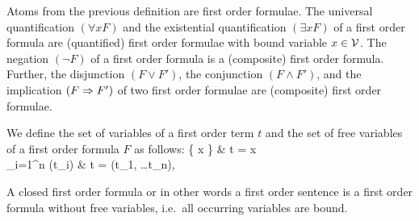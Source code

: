 
\begin{definition}\label{def:syntax:FOF}
	Atoms from the previous definition are {\myem first order formulae}.  
	The universal quantification $(\forall x F)$ 
	and the existential quantification $(\exists x F)$ 
	of a first order formula are (quantified) first order formulae
	with {\myem bound} variable $x\in{\mathcal V}$.
	The negation $(\lnot F)$ of a first order formula
	is a (composite) first order formula.
	Further, the disjunction $(F \lor F')$, 
	the conjunction $(F \land F') $, 
	and the implication $(F \Rightarrow F')$ 
	of two first order formulae
	are (composite) first order formulae.
\end{definition}

\begin{definition}\label{def:term:vars}\label{def:fof:fvars}\label{def:fof:sentence}
	We define the set of variables of a first order term $t$ and the set of {\myem free} variables of a first order formula $F$ as follows:
 {
		\{ x \} &  t = x \in \mcV \\
		\bigcup_{i=1}^n \var(t_i) &   t = \mf(t_1, \ldots t_n), \mf \in \mcFfn
	}
\end{definition}

\begin{definition}\label{def:fof:closed}
	A closed first order formula or in other words
	a first order {\myem sentence} 
	is a first order formula without free variables,
	i.e.~all occurring variables are bound.
\end{definition}

